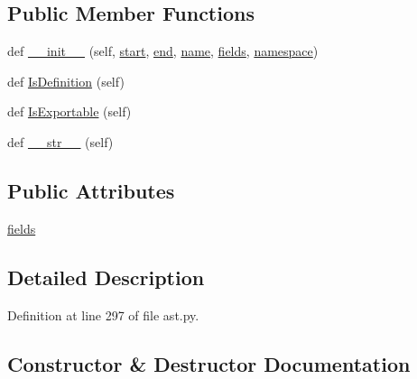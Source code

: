 \subsection*{Public Member Functions}
\begin{DoxyCompactItemize}
\item 
def \hyperlink{classcpp_1_1ast_1_1__NestedType_a63acff60f38885be6cc11231fffc3f4e}{\+\_\+\+\_\+init\+\_\+\+\_\+} (self, \hyperlink{classcpp_1_1ast_1_1Node_a7b2aa97e6a049bb1a93aea48c48f1f44}{start}, \hyperlink{classcpp_1_1ast_1_1Node_a3c5e5246ccf619df28eca02e29d69647}{end}, \hyperlink{classcpp_1_1ast_1_1__GenericDeclaration_af774f4729dfd78d0538a6782fe8514c1}{name}, \hyperlink{classcpp_1_1ast_1_1__NestedType_aed69c37a409b4d26e6cfde2de3185d86}{fields}, \hyperlink{classcpp_1_1ast_1_1__GenericDeclaration_a8aee3f11b37449d54b42a78e0a689f46}{namespace})
\item 
def \hyperlink{classcpp_1_1ast_1_1__NestedType_a9f160999863f39c9032f60b014e213d5}{Is\+Definition} (self)
\item 
def \hyperlink{classcpp_1_1ast_1_1__NestedType_a689f8b0dc20e6070938825eee483dd2f}{Is\+Exportable} (self)
\item 
def \hyperlink{classcpp_1_1ast_1_1__NestedType_a18901ec6acba88c526d703444bf4d52c}{\+\_\+\+\_\+str\+\_\+\+\_\+} (self)
\end{DoxyCompactItemize}
\subsection*{Public Attributes}
\begin{DoxyCompactItemize}
\item 
\hyperlink{classcpp_1_1ast_1_1__NestedType_aed69c37a409b4d26e6cfde2de3185d86}{fields}
\end{DoxyCompactItemize}


\subsection{Detailed Description}


Definition at line 297 of file ast.\+py.



\subsection{Constructor \& Destructor Documentation}
\mbox{\label{classcpp_1_1ast_1_1__NestedType_a63acff60f38885be6cc11231fffc3f4e}} 

